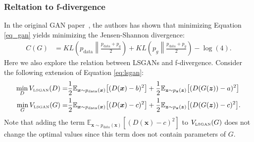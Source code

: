 \documentclass{article} %
\begin{document}
\subsubsection{Reltation to f-divergence}
In the original GAN paper~\cite{Goodfellow2014}, the authors has shown that minimizing Equation \ref{eq_gan} yields minimizing the Jensen-Shannon divergence:
\begin{equation}
\label{eq:gan_js}
\begin{split}
C(G) &=KL \left(p_\text{data} \left \| \frac{p_\text{data} + p_g}{2} \right. \right) + KL \left(p_g \left \| \frac{p_\text{data} + p_g}{2} \right. \right)-\log(4). 
\end{split}
\end{equation}
\normalsize
Here we also explore the relation between LSGANs and f-divergence. Consider the following extension of Equation \ref{eq:lsgan}:
\begin{equation}
\label{eq:general_lsgan}
\begin{split}
\min_D V_{\text{\tiny LSGAN}}(D) = &\frac{1}{2}\mathbb{E}_{\bm{x} \sim p_{\text{data}}(\bm{x})}\bigl[(D(\bm{x})-b)^2\bigr] + \frac{1}{2}\mathbb{E}_{\bm{z} \sim p_{\bm{z}}(\bm{z})}\bigl[(D(G(\bm{z}))-a)^2\bigr] \\
\min_G V_{\text{\tiny LSGAN}}(G) = &\frac{1}{2}\mathbb{E}_{\bm{x} \sim p_{\text{data}}(\bm{x})}\bigl[(D(\bm{x})-c)^2\bigr] + \frac{1}{2}\mathbb{E}_{\bm{z} \sim p_{\bm{z}}(\bm{z})}\bigl[(D(G(\bm{z}))-c)^2\bigr].
\end{split}
\end{equation}
Note that adding the term $\mathbb{E}_{\bm{x} \sim p_{\text{data}}(\bm{x})}[(D(\bm{x})-c)^2]$ to $V_{\text{\tiny LSGAN}}(G)$ does not change the optimal values since this term does not contain parameters of $G$.
\end{document}
